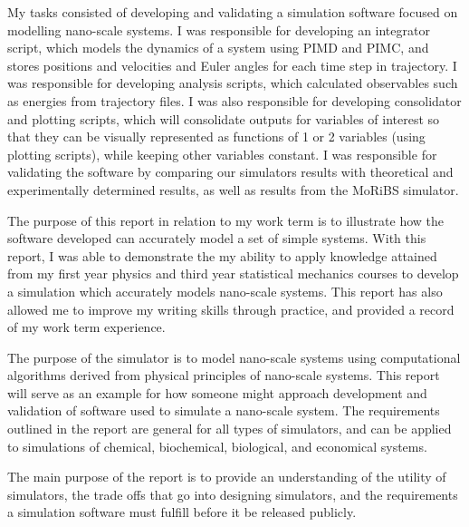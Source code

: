 \documentclass{ece}
\begin{document}
My tasks consisted of developing and validating a simulation software  focused on modelling nano-scale systems. I was responsible for developing an integrator script, which models the dynamics of a system using \gls{PIMD} and \gls{PIMC}, and stores positions and velocities and Euler angles for each time step in trajectory. I was responsible for developing analysis scripts, which calculated observables such as energies from trajectory files. I was also responsible for developing consolidator and plotting scripts, which will consolidate outputs for variables of interest so that they can be visually represented as functions of 1 or 2 variables (using plotting scripts), while keeping other variables constant. I was responsible for validating the software by comparing our simulators results with theoretical and experimentally determined results, as well as results from the \gls{MoRiBS} simulator. 

The purpose of this report in relation to my work term is to illustrate how the software developed can accurately model a set of simple systems. With this report, I was able to demonstrate the my ability to apply knowledge attained from my first year physics and third year statistical mechanics courses to develop a simulation which accurately models nano-scale systems. This report has also allowed me to improve my writing skills through practice, and provided a record of my work term experience.

The purpose of the simulator is to model nano-scale systems using computational algorithms derived from physical principles of nano-scale systems. This report will serve as an example for how someone might approach development and validation of software used to simulate a nano-scale system. The requirements outlined in the report are general for all types of simulators, and can be applied to simulations of chemical, biochemical, biological, and economical systems.


\summary

The main purpose of the report is to provide an understanding of the utility of simulators, the trade offs that go into designing simulators, and the requirements a simulation software must fulfill before it be released publicly. 
\end{document}
